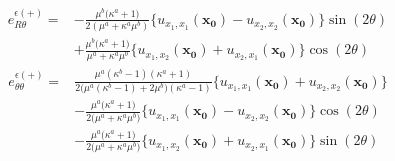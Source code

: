 \begin{align}
	e_{R\theta}^{\epsilon(+)}
	=&-\frac{\mu^{b}\bigl(\kappa^{a}+1\bigr)}{2(\mu^{a}+\kappa^{a}\mu^{b})}
	\bigl\{u_{x_{1},x_{1}}(\bm{x_{0}})-u_{x_{2},x_{2}}(\bm{x_{0}})\bigr\}\sin(2\theta)
	\nonumber
	\\
	&+\frac{\mu^{b}\bigl(\kappa^{a}+1\bigr)}{\mu^{a}+\kappa^{a}\mu^{b}}
	\bigl\{u_{x_{1},x_{2}}(\bm{x_{0}})+u_{x_{2},x_{1}}(\bm{x_{0}})\bigr\}\cos(2\theta)
	\label{eq:eRThOutEpsSol}
\end{align}
\begin{align}
	e_{\theta\theta}^{\epsilon(+)}
	=&\frac{\mu^{a}(\kappa^{b}-1)(\kappa^{a}+1)}
	{2\bigl(\mu^{a}(\kappa^{b}-1)+2\mu^{b}\bigr)(\kappa^{a}-1)}
	\bigl\{u_{x_{1},x_{1}}(\bm{x_{0}})+u_{x_{2},x_{2}}(\bm{x_{0}})\bigr\}
	\nonumber
	\\
	&-\frac{\mu^{a}\bigl(\kappa^{a}+1\bigr)}{2\bigl(\mu^{a}+\kappa^{a}\mu^{b}\bigr)}
	\bigl\{u_{x_{1},x_{1}}(\bm{x_{0}})-u_{x_{2},x_{2}}(\bm{x_{0}})\bigr\}\cos(2\theta)
	\nonumber
	\\
	&-\frac{\mu^{a}\bigl(\kappa^{a}+1\bigr)}{2\bigl(\mu^{a}+\kappa^{a}\mu^{b}\bigr)}
	\bigl\{u_{x_{1},x_{2}}(\bm{x_{0}})+u_{x_{2},x_{1}}(\bm{x_{0}})\bigr\}\sin(2\theta)
	\label{eq:eThThOutEpsSol}
\end{align}

